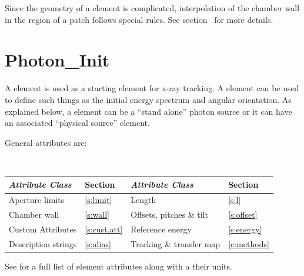{
Since the geometry of a  element is complicated, interpolation of the chamber wall in the
region of a patch follows special rules. See section~ for more details.

\section{Photon_Init}
\label{s:photon.init}

A  element is used as a starting element for x-ray
tracking.  A  element can be used to define such
things as the initial energy spectrum and angular orientation. As
explained below, a  element can be a ``stand alone''
photon source or it can have an associated ``physical source''
element.

General  attributes are:
\begin{center}
\tt
\begin{tabular}{llll} \toprule
  {\sl Attribute Class}      & Section           & {\sl Attribute Class}      & Section         \\ \midrule
  Aperture limits            & \ref{s:limit}     & Length                     & \ref{s:l}       \\
  Chamber wall               & \ref{s:wall}      & Offsets, pitches \& tilt   & \ref{s:offset}  \\
  Custom Attributes          & \ref{s:cust.att}  & Reference energy           & \ref{s:energy}  \\ 
  Description strings        & \ref{s:alias}     & Tracking \& transfer map   & \ref{c:methods} \\ 
  \bottomrule
\end{tabular}
\end{center}
\toffset
See  for a full list of element attributes along with a their units.

}
